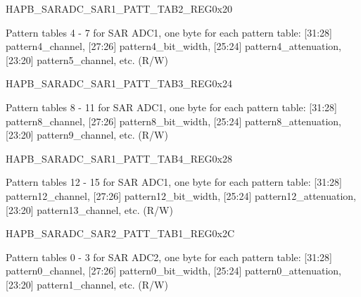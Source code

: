 \begin{register}{H}{APB\_SARADC\_SAR1\_PATT\_TAB2\_REG}{0x20}\label{regdesc:APBSARADCSAR1PATTTAB2REG}
%
\regnewline%
\begin{regdesc}\begin{reglist}
\item [APB\_SARADC\_SAR1\_PATT\_TAB2\_REG]Pattern tables 4 - 7 for SAR ADC1, one byte for each pattern table: [31:28] pattern4\_channel, [27:26] pattern4\_bit\_width, [25:24] pattern4\_attenuation, [23:20] pattern5\_channel,  etc. (R/W)
\end{reglist}\end{regdesc}
\end{register}


\begin{register}{H}{APB\_SARADC\_SAR1\_PATT\_TAB3\_REG}{0x24}\label{regdesc:APBSARADCSAR1PATTTAB3REG}
%
\regnewline%
\begin{regdesc}\begin{reglist}
\item [APB\_SARADC\_SAR1\_PATT\_TAB3\_REG]Pattern tables 8 - 11 for SAR ADC1, one byte for each pattern table: [31:28] pattern8\_channel, [27:26] pattern8\_bit\_width, [25:24] pattern8\_attenuation, [23:20] pattern9\_channel,  etc. (R/W)
\end{reglist}\end{regdesc}
\end{register}


\begin{register}{H}{APB\_SARADC\_SAR1\_PATT\_TAB4\_REG}{0x28}\label{regdesc:APBSARADCSAR1PATTTAB4REG}
%
\regnewline%
\begin{regdesc}\begin{reglist}
\item [APB\_SARADC\_SAR1\_PATT\_TAB4\_REG]Pattern tables 12 - 15 for SAR ADC1, one byte for each pattern table: [31:28] pattern12\_channel, [27:26] pattern12\_bit\_width, [25:24] pattern12\_attenuation, [23:20] pattern13\_channel,  etc. (R/W)
\end{reglist}\end{regdesc}
\end{register}


\begin{register}{H}{APB\_SARADC\_SAR2\_PATT\_TAB1\_REG}{0x2C}\label{regdesc:APBSARADCSAR2PATTTAB1REG}
%
\regnewline%
\begin{regdesc}\begin{reglist}
\item [APB\_SARADC\_SAR2\_PATT\_TAB1\_REG]Pattern tables 0 - 3 for SAR ADC2, one byte for each pattern table: [31:28] pattern0\_channel, [27:26] pattern0\_bit\_width, [25:24] pattern0\_attenuation, [23:20] pattern1\_channel,  etc. (R/W)
\end{reglist}\end{regdesc}
\end{register}


